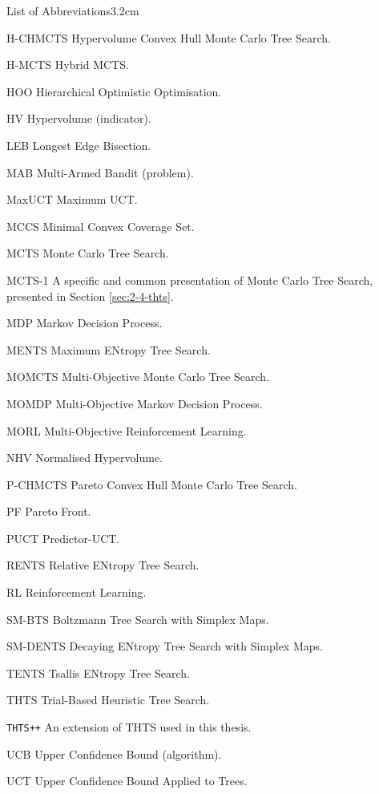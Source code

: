 \begin{mclistof}{List of Abbreviations}{3.2cm}
    \item[H-CHMCTS] Hypervolume Convex Hull Monte Carlo Tree Search.
    \item[H-MCTS] Hybrid MCTS.
    \item[HOO] Hierarchical Optimistic Optimisation.
    \item[HV] Hypervolume (indicator).
    \item[LEB] Longest Edge Bisection.
    \item[MAB] Multi-Armed Bandit (problem). 
    \item[MaxUCT] Maximum UCT.
    \item[MCCS] Minimal Convex Coverage Set.
    \item[MCTS] Monte Carlo Tree Search.
    \item[MCTS-1] A specific and common presentation of Monte Carlo Tree Search, presented in Section \ref{sec:2-4-thts}.
    \item[MDP] Markov Decision Process.
    \item[MENTS] Maximum ENtropy Tree Search.
    \item[MOMCTS] Multi-Objective Monte Carlo Tree Search.
    \item[MOMDP] Multi-Objective Markov Decision Process.
    \item[MORL] Multi-Objective Reinforcement Learning.
    \item[NHV] Normalised Hypervolume.
    \item[P-CHMCTS] Pareto Convex Hull Monte Carlo Tree Search.
    \item[PF] Pareto Front.
    \item[PUCT] Predictor-UCT. 
    \item[RENTS] Relative ENtropy Tree Search.
    \item[RL] Reinforcement Learning.
    \item[SM-BTS] Boltzmann Tree Search with Simplex Maps.
    \item[SM-DENTS] Decaying ENtropy Tree Search with Simplex Maps.
    \item[TENTS] Tsallis ENtropy Tree Search.
    \item[THTS] Trial-Based Heuristic Tree Search.
    \item[\texttt{THTS++}] An extension of THTS used in this thesis.
    \item[UCB] Upper Confidence Bound (algorithm).
    \item[UCT] Upper Confidence Bound Applied to Trees.
\end{mclistof} 


